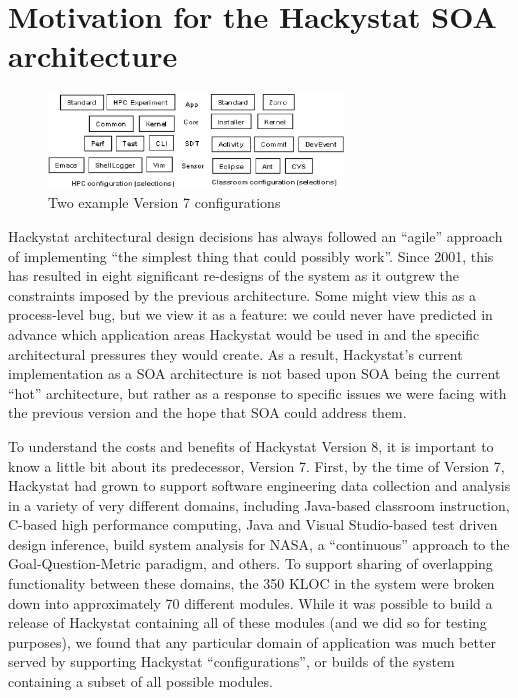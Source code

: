 \documentclass[conference,compsoc]{IEEEtran}
\begin{document}
\section{Motivation for the Hackystat SOA architecture}
\label{sec:motivation}


\begin{figure}[ht]
  \center
  \includegraphics[width=0.7\textwidth]{configurations5.eps}
  \caption{Two example Version 7 configurations}
  \label{fig:configurations}
\end{figure} 

Hackystat architectural design decisions has always followed an ``agile''
approach of implementing ``the simplest thing that could possibly work''.
Since 2001, this has resulted in eight significant re-designs of the system
as it outgrew the constraints imposed by the previous architecture.  Some
might view this as a process-level bug, but we view it as a feature: we
could never have predicted in advance which application areas Hackystat
would be used in and the specific architectural pressures they would
create.  As a result, Hackystat's current implementation as a SOA
architecture is not based upon SOA being the current ``hot'' architecture,
but rather as a response to specific issues we were facing with the
previous version and the hope that SOA could address them.

To understand the costs and benefits of Hackystat Version 8, it is
important to know a little bit about its predecessor, Version 7.  First, by
the time of Version 7, Hackystat had grown to support software engineering data
collection and analysis in a variety of very different domains, including
Java-based classroom instruction, C-based high performance computing, Java
and Visual Studio-based test driven design inference, build system analysis
for NASA, a ``continuous'' approach to the Goal-Question-Metric paradigm,
and others.  To support sharing of overlapping functionality between these
domains, the 350 KLOC in the system were broken down into approximately 70
different modules.  While it was possible to build a release of Hackystat
containing all of these modules (and we did so for testing purposes), we
found that any particular domain of application was much better served by
supporting Hackystat ``configurations'', or builds of the system containing
a subset of all possible modules.
\end{document}
